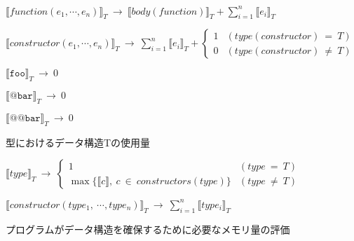 \begin{figure}[p]
\begin{framed}
  \begin{math}
    \llbracket function(e_1, \cdots, e_n) \rrbracket _T
    \ \rightarrow \
    \llbracket body(function) \rrbracket _T + \sum^n_{i=1} \llbracket e_i \rrbracket _T
  \end{math}
  \vspace{10pt}

  \begin{math}
    \llbracket constructor(e_1, \cdots, e_n) \rrbracket _T
    \ \rightarrow \
    \sum^n_{i=1} \llbracket e_i \rrbracket _T +
    \begin{cases}
      1 & (type(constructor) \ = \ T) \\
      0 & (type(constructor) \ \neq \ T)
    \end{cases}
  \end{math}
  \vspace{10pt}

  \begin{math}
    \llbracket \texttt{foo} \rrbracket _T \ \rightarrow \ 0
  \end{math}
  \vspace{10pt}

  \begin{math}
    \llbracket \texttt{@bar} \rrbracket _T \ \rightarrow \ 0
  \end{math}
  \vspace{10pt}

  \begin{math}
    \llbracket \texttt{@@bar} \rrbracket _T \ \rightarrow \ 0
  \end{math}
  \vspace{25pt}

  型におけるデータ構造Tの使用量 \vspace{10pt}

  \begin{math}
    \llbracket
      type
    \rrbracket _T
    \ \rightarrow \
    \begin{cases}
      1 & (type \ = \ T) \\
      \max \{ \llbracket c \rrbracket, \ c \ \in \ constructors(type) \} & (type \ \neq \ T)
    \end{cases}
  \end{math}
  \vspace{10pt}

  \begin{math}
    \llbracket
      constructor(type_1, \ \cdots, type_n)
    \rrbracket _T
    \ \rightarrow \
    \sum^n_{i=1} \llbracket type_i \rrbracket _T
  \end{math}
  \vspace{10pt}
\end{framed}
\caption{プログラムがデータ構造を確保するために必要なメモリ量の評価}
\label{fig:memory-eval}
\end{figure}
